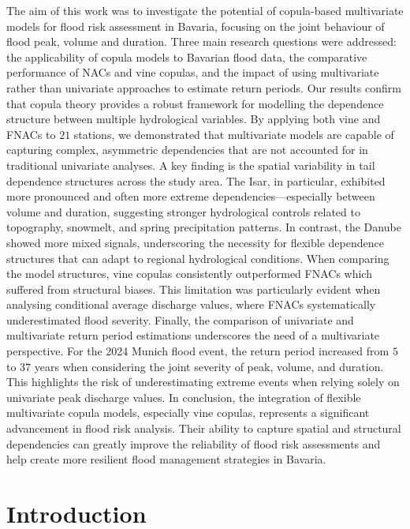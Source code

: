 \documentclass[
]{krantz}
\begin{document}
The aim of this work was to investigate the potential of copula-based multivariate models for flood risk assessment in Bavaria, focusing on the joint behaviour of flood peak, volume and duration.
Three main research questions were addressed: the applicability of copula models to Bavarian flood data, the comparative performance of NACs and vine copulas, and the impact of using multivariate rather than univariate approaches to estimate return periods.
Our results confirm that copula theory provides a robust framework for modelling the dependence structure between multiple hydrological variables. By applying both vine and FNACs to \(21\) stations, we demonstrated that multivariate models are capable of capturing complex, asymmetric dependencies that are not accounted for in traditional univariate analyses.
A key finding is the spatial variability in tail dependence structures across the study area. The Isar, in particular, exhibited more pronounced and often more extreme dependencies---especially between volume and duration, suggesting stronger hydrological controls related to topography, snowmelt, and spring precipitation patterns.
In contrast, the Danube showed more mixed signals, underscoring the necessity for flexible dependence structures that can adapt to regional hydrological conditions.
When comparing the model structures, vine copulas consistently outperformed FNACs which suffered from structural biases. This limitation was particularly evident when analysing conditional average discharge values, where FNACs systematically underestimated flood severity.
Finally, the comparison of univariate and multivariate return period estimations underscores the need of a multivariate perspective.
For the 2024 Munich flood event, the return period increased from \(5\) to \(37\) years when considering the joint severity of peak, volume, and duration. This highlights the risk of underestimating extreme events when relying solely on univariate peak discharge values.
In conclusion, the integration of flexible multivariate copula models, especially vine copulas, represents a significant advancement in flood risk analysis. Their ability to capture spatial and structural dependencies can greatly improve the reliability of flood risk assessments and help create more resilient flood management strategies in Bavaria.

\chapter{Introduction}\label{introduction-2}
\end{document}
